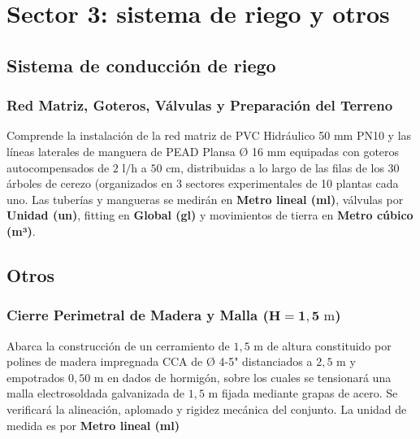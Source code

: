 \section{Sector 3: sistema de riego y otros}

\subsection{Sistema de conducción de riego}

\subsubsection*{Red Matriz, Goteros, Válvulas y Preparación del Terreno}

Comprende la instalación de la red matriz de PVC Hidráulico 50 mm PN10 y las líneas laterales de manguera de PEAD Plansa Ø 16 mm equipadas con goteros autocompensados de \(2\text{~l/h}\) a \(50\text{~cm}\), distribuidas a lo largo de las filas de los 30 árboles de cerezo (organizados en 3 sectores experimentales de 10 plantas cada uno. Las tuberías y mangueras se medirán en \textbf{Metro lineal (ml)}, válvulas por \textbf{Unidad (un)}, fitting en \textbf{Global (gl)} y movimientos de tierra en \textbf{Metro cúbico (m³)}.

\subsection{Otros}

\subsubsection*{\texorpdfstring{Cierre Perimetral de Madera y Malla (\(\mathbf{H} = \mathbf{1},\mathbf{5}\text{~m}\))}{Cierre Perimetral de Madera y Malla (\textbackslash mathbf\{H\} = \textbackslash mathbf\{1\},\textbackslash mathbf\{5\}\textbackslash text\{\textasciitilde m\})}}

Abarca la construcción de un cerramiento de \(1,5\text{~m}\) de altura constituido por polines de madera impregnada CCA de Ø 4-5" distanciados a \(2,5\text{~m}\) y empotrados \(0,50\text{~m}\) en dados de hormigón, sobre los cuales se tensionará una malla electrosoldada galvanizada de \(1,5\text{~m}\) fijada mediante grapas de acero. Se verificará la alineación, aplomado y rigidez mecánica del conjunto. La unidad de medida es por \textbf{Metro lineal (ml)}
